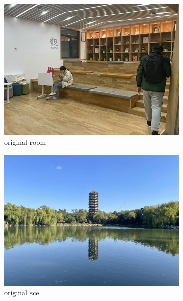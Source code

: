 \documentclass[11pt]{article}
\begin{document}
\begin{figure}[ht!]
    \centering
    \hfill%
    \begin{subfigure}[]{0.333\linewidth}
        \centering
        \includegraphics[width=\linewidth]{fig/room.jpg}
        \caption{original room}
    \end{subfigure}%
    \hfill%
    \begin{subfigure}[]{0.333\linewidth}
        \centering
        \includegraphics[width=\linewidth]{fig/sce.jpg}
        \caption{original sce}
    \end{subfigure}%
    \hfill%
    \begin{subfigure}[]{0.333\linewidth}
        \centering

\end{subfigure}
\end{figure}
\end{document}
